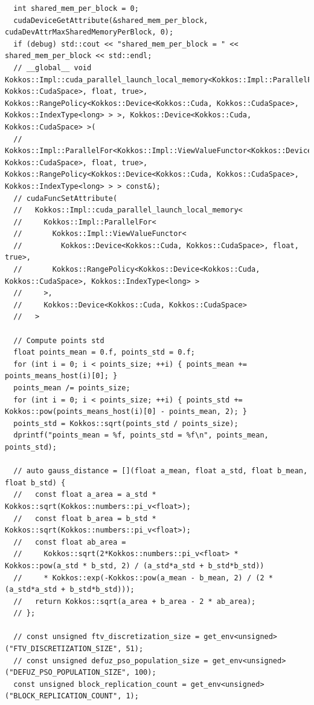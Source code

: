 \begin{verbatim}
  int shared_mem_per_block = 0;
  cudaDeviceGetAttribute(&shared_mem_per_block, cudaDevAttrMaxSharedMemoryPerBlock, 0);
  if (debug) std::cout << "shared_mem_per_block = " << shared_mem_per_block << std::endl;
  // __global__ void Kokkos::Impl::cuda_parallel_launch_local_memory<Kokkos::Impl::ParallelFor<Kokkos::Impl::ViewValueFunctor<Kokkos::Device<Kokkos::Cuda, Kokkos::CudaSpace>, float, true>, Kokkos::RangePolicy<Kokkos::Device<Kokkos::Cuda, Kokkos::CudaSpace>, Kokkos::IndexType<long> > >, Kokkos::Device<Kokkos::Cuda, Kokkos::CudaSpace> >(
  //   Kokkos::Impl::ParallelFor<Kokkos::Impl::ViewValueFunctor<Kokkos::Device<Kokkos::Cuda, Kokkos::CudaSpace>, float, true>, Kokkos::RangePolicy<Kokkos::Device<Kokkos::Cuda, Kokkos::CudaSpace>, Kokkos::IndexType<long> > > const&);
  // cudaFuncSetAttribute(
  //   Kokkos::Impl::cuda_parallel_launch_local_memory<
  //     Kokkos::Impl::ParallelFor<
  //       Kokkos::Impl::ViewValueFunctor<
  //         Kokkos::Device<Kokkos::Cuda, Kokkos::CudaSpace>, float, true>,
  //       Kokkos::RangePolicy<Kokkos::Device<Kokkos::Cuda, Kokkos::CudaSpace>, Kokkos::IndexType<long> >
  //     >,
  //     Kokkos::Device<Kokkos::Cuda, Kokkos::CudaSpace>
  //   >

  // Compute points std
  float points_mean = 0.f, points_std = 0.f;
  for (int i = 0; i < points_size; ++i) { points_mean += points_means_host(i)[0]; }
  points_mean /= points_size;
  for (int i = 0; i < points_size; ++i) { points_std += Kokkos::pow(points_means_host(i)[0] - points_mean, 2); }
  points_std = Kokkos::sqrt(points_std / points_size);
  dprintf("points_mean = %f, points_std = %f\n", points_mean, points_std);

  // auto gauss_distance = [](float a_mean, float a_std, float b_mean, float b_std) {
  //   const float a_area = a_std * Kokkos::sqrt(Kokkos::numbers::pi_v<float>);
  //   const float b_area = b_std * Kokkos::sqrt(Kokkos::numbers::pi_v<float>);
  //   const float ab_area =
  //     Kokkos::sqrt(2*Kokkos::numbers::pi_v<float> * Kokkos::pow(a_std * b_std, 2) / (a_std*a_std + b_std*b_std))
  //     * Kokkos::exp(-Kokkos::pow(a_mean - b_mean, 2) / (2 * (a_std*a_std + b_std*b_std)));
  //   return Kokkos::sqrt(a_area + b_area - 2 * ab_area);
  // };

  // const unsigned ftv_discretization_size = get_env<unsigned>("FTV_DISCRETIZATION_SIZE", 51);
  // const unsigned defuz_pso_population_size = get_env<unsigned>("DEFUZ_PSO_POPULATION_SIZE", 100);
  const unsigned block_replication_count = get_env<unsigned>("BLOCK_REPLICATION_COUNT", 1);


\end{verbatim}
